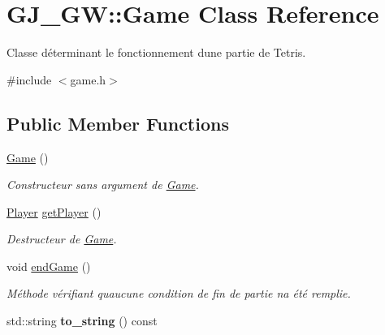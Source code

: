\hypertarget{class_g_j___g_w_1_1_game}{}\section{G\+J\+\_\+\+GW\+:\+:Game Class Reference}
\label{class_g_j___g_w_1_1_game}


Classe déterminant le fonctionnement d\textquotesingle{}une partie de Tetris.  




{\ttfamily \#include $<$game.\+h$>$}

\subsection*{Public Member Functions}
\begin{DoxyCompactItemize}
\item 
\hyperlink{class_g_j___g_w_1_1_game_acabf662fb6929976e25cf29006f665c0}{Game} ()
\begin{DoxyCompactList}\small\item\em Constructeur sans argument de \hyperlink{class_g_j___g_w_1_1_game}{Game}. \end{DoxyCompactList}\item 
\hyperlink{class_g_j___g_w_1_1_player}{Player} \hyperlink{class_g_j___g_w_1_1_game_addf52c888f8deed2651bda020ecde811}{get\+Player} ()
\begin{DoxyCompactList}\small\item\em Destructeur de \hyperlink{class_g_j___g_w_1_1_game}{Game}. \end{DoxyCompactList}\item 
void \hyperlink{class_g_j___g_w_1_1_game_ad09c3f7d5281b6bbc1a7166cb8077af1}{end\+Game} ()
\begin{DoxyCompactList}\small\item\em Méthode vérifiant qu\textquotesingle{}aucune condition de fin de partie n\textquotesingle{}a été remplie. \end{DoxyCompactList}\item 
\hypertarget{class_g_j___g_w_1_1_game_a7fe0bd7b7363f1c81944662c887d8693}{}\label{class_g_j___g_w_1_1_game_a7fe0bd7b7363f1c81944662c887d8693} 
std\+::string {\bfseries to\+\_\+string} () const
\end{DoxyCompactItemize}

